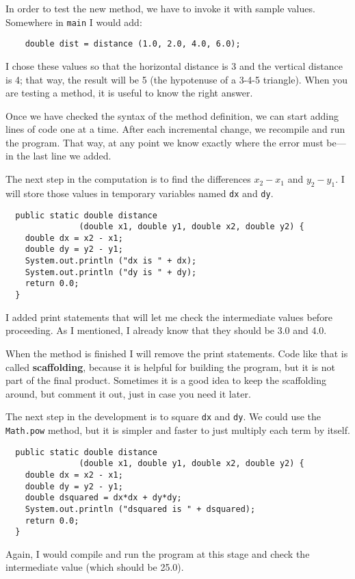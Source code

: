 \documentclass{book}
\begin{document}
In order to test the new method, we have to invoke it with
sample values.  Somewhere in {\tt main} I would add:

\begin{verbatim}
    double dist = distance (1.0, 2.0, 4.0, 6.0);
\end{verbatim}
%
I chose these values so that the horizontal
distance is 3 and the vertical distance is 4; that way,
the result will be 5 (the hypotenuse of a 3-4-5 triangle).
When you are testing a method, it is useful to know the right
answer.

Once we have checked the syntax of the method definition, we
can start adding lines of code one at a time.  After each
incremental change, we recompile and run the program.  That
way, at any point we know exactly where the error must be---in
the last line we added.

The next step in the computation is to find the differences
$x_2 - x_1$ and $y_2 - y_1$.  I will store those values in
temporary variables named {\tt dx} and {\tt dy}.

\begin{verbatim}
  public static double distance
               (double x1, double y1, double x2, double y2) {
    double dx = x2 - x1;
    double dy = y2 - y1;
    System.out.println ("dx is " + dx);
    System.out.println ("dy is " + dy);
    return 0.0;
  }
\end{verbatim}
%
I added print statements that will let me check the intermediate
values before proceeding.  As I mentioned, I already know that they
should be 3.0 and 4.0.


When the method is finished I will remove the print statements.  Code
like that is called {\bf scaffolding}, because it is helpful for
building the program, but it is not part of the final product.
Sometimes it is a good idea to keep the scaffolding around, but
comment it out, just in case you need it later.

The next step in the development is to square {\tt dx} and {\tt dy}.
We could use the {\tt Math.pow} method, but it is simpler and
faster to just multiply each term by itself.

\begin{verbatim}
  public static double distance
               (double x1, double y1, double x2, double y2) {
    double dx = x2 - x1;
    double dy = y2 - y1;
    double dsquared = dx*dx + dy*dy;
    System.out.println ("dsquared is " + dsquared);
    return 0.0;
  }
\end{verbatim}
%
Again, I would compile and run the program at this stage
and check the intermediate value (which should be 25.0).
\end{document}
